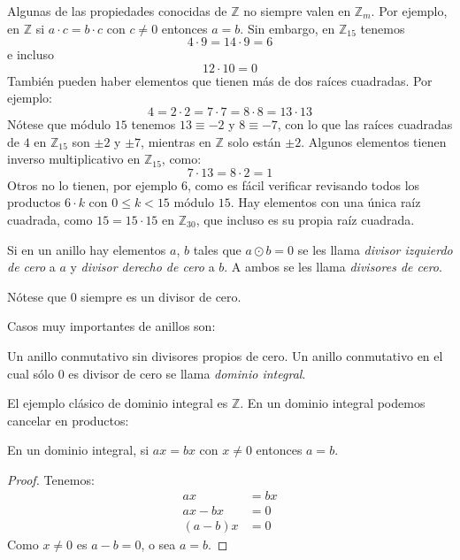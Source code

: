   Algunas de las propiedades conocidas de \(\mathbb{Z}\)
  no siempre valen en \(\mathbb{Z}_m\).
  Por ejemplo,
  en \(\mathbb{Z}\)
  si \(a \cdot c = b \cdot c\) con \(c \ne 0\)
  entonces \(a = b\).
  Sin embargo,
  en \(\mathbb{Z}_{15}\)
  tenemos
  \begin{equation*}
    4 \cdot 9 =	 14 \cdot 9 = 6
  \end{equation*}
  e incluso
  \begin{equation*}
    12 \cdot 10 = 0
  \end{equation*}
  También pueden haber elementos que tienen más de dos raíces cuadradas.
  Por ejemplo:
  \begin{equation*}
    4 = 2 \cdot 2 = 7 \cdot 7 = 8 \cdot 8 = 13 \cdot 13
  \end{equation*}
  Nótese que módulo \(15\) tenemos \(13 \equiv -2\) y \(8 \equiv -7\),
  con lo que las raíces cuadradas de \(4\) en \(\mathbb{Z}_{15}\)
  son \(\pm 2\) y \(\pm 7\),
  mientras en \(\mathbb{Z}\) solo están \(\pm 2\).
  Algunos elementos tienen inverso multiplicativo
  en \(\mathbb{Z}_{15}\),
  como:
  \begin{equation*}
    7 \cdot 13 = 8 \cdot 2 = 1
  \end{equation*}
  Otros no lo tienen,
  por ejemplo \(6\),
  como es fácil verificar revisando todos los productos \(6 \cdot k\)
  con \(0 \le k < 15\) módulo \(15\).
  Hay elementos con una única raíz cuadrada,
  como \(15 = 15 \cdot 15\) en \(\mathbb{Z}_{30}\),
  que incluso es su propia raíz cuadrada.
  \begin{definition}
    \label{def:ring-zero-divisor}
    Si en un anillo hay elementos \(a\), \(b\)
    tales que \(a \odot b = 0\)
    se les llama \emph{divisor izquierdo de cero} a \(a\)
    y \emph{divisor derecho de cero} a \(b\).
    A ambos se les llama \emph{divisores de cero}.
  \end{definition}
  \noindent
  Nótese que \(0\) siempre es un divisor de cero.

  Casos muy importantes de anillos son:
  \begin{definition}
	     {Un anillo conmutativo sin divisores propios de cero.}
    \label{def:ID}
    Un anillo conmutativo en el cual sólo \(0\) es divisor de cero
    se llama \emph{dominio integral}.
  \end{definition}
  \noindent
  El ejemplo clásico de dominio integral es \(\mathbb{Z}\).
  En un dominio integral podemos cancelar en productos:
  \begin{theorem}
    \label{theo:ID-*-cancellation}
    En un dominio integral,
    si \(a x = b x\) con \(x \ne 0\)
    entonces \(a = b\).
  \end{theorem}
  \begin{proof}
    Tenemos:
    \begin{align*}
      a x
	&= b x \\
      a x - b x
	&= 0 \\
      (a - b) x
	&= 0
    \end{align*}
    Como \(x \ne 0\) es \(a - b = 0\),
    o sea \(a = b\).
  \end{proof}

